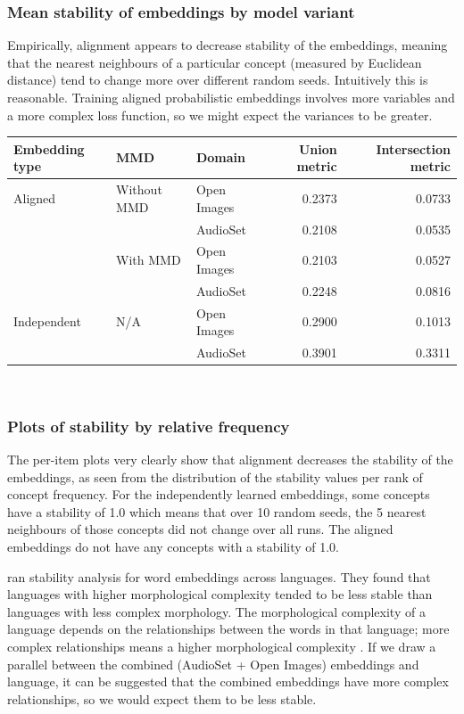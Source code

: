 \subsubsection{Mean stability of embeddings by model variant}

Empirically, alignment appears to decrease stability of the embeddings, meaning that the nearest neighbours of a particular concept (measured by Euclidean distance) tend to change more over different random seeds. Intuitively this is reasonable. Training aligned probabilistic embeddings involves more variables and a more complex loss function, so we might expect the variances to be greater. 

\begin{table}[H]
\centering
\begin{tabular}{lllrr}
\toprule
Embedding type  & MMD    & Domain          & Union metric & Intersection metric         \\
\midrule
Aligned & Without MMD   & Open Images &  0.2373 & 0.0733\\
            &     & AudioSet &  0.2108 & 0.0535\\
            & With MMD & Open Images &  0.2103 & 0.0527\\
                   &     & AudioSet &  0.2248 & 0.0816\\
Independent & N/A   & Open Images &  0.2900 & 0.1013 \\
                   &     & AudioSet &  0.3901 & 0.3311 \\
\bottomrule
\end{tabular}\\
\end{table}

\subsubsection{Plots of stability by relative frequency}

The per-item plots very clearly show that alignment decreases the stability of the embeddings, as seen from the distribution of the stability values per rank of concept frequency. For the independently learned embeddings, some concepts have a stability of 1.0 which means that over 10 random seeds, the 5 nearest neighbours of those concepts did not change over all runs. The aligned embeddings do not have any concepts with a stability of 1.0. 

\cite{WordEmbeddingStability} ran stability analysis for word embeddings across languages. They found that languages with higher morphological complexity tended to be less stable than languages with less complex morphology. The morphological complexity of a language depends on the relationships between the words in that language; more complex relationships means a higher morphological complexity \cite{MorphologicalComplexity}. If we draw a parallel between the combined (AudioSet + Open Images) embeddings and language, it can be suggested that the combined embeddings have more complex relationships, so we would expect them to be less stable. 

